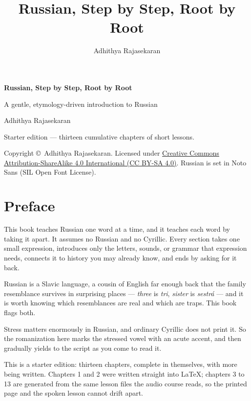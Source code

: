 \documentclass[11pt,twoside]{book}
\title{\Huge Russian, Step by Step, Root by Root}
\author{Adhithya Rajasekaran}
\date{}
\begin{document}
\frontmatter

\begin{titlepage}
  \centering
  \vspace*{3cm}
  {\Huge\bfseries Russian, Step by Step, Root by Root\par}
  \vspace{1cm}
  {\Large A gentle, etymology-driven introduction to Russian\par}
  \vspace{1.5cm}
  {\large Adhithya Rajasekaran\par}
  \vfill
  {\large Starter edition --- thirteen cumulative chapters of short lessons.\par}
  \vspace{2cm}
  {\normalsize
    Copyright \copyright\ Adhithya Rajasekaran. Licensed under
    \href{https://creativecommons.org/licenses/by-sa/4.0/}%
    {Creative Commons Attribution-ShareAlike 4.0 International (CC BY-SA 4.0)}.
    Russian is set in Noto Sans (SIL Open Font License).\par
  }
\end{titlepage}

\chapter*{Preface}

This book teaches Russian one word at a time, and it teaches each word by taking
it apart. It assumes no Russian and no Cyrillic. Every section takes one small
expression, introduces only the letters, sounds, or grammar that expression
needs, connects it to history you may already know, and ends by asking for it
back.

Russian is a Slavic language, a cousin of English far enough back that the
family resemblance survives in surprising places --- \emph{three} is
\emph{tri}, \emph{sister} is \emph{sestr\'{a}} --- and it is worth knowing which
resemblances are real and which are traps. This book flags both.

Stress matters enormously in Russian, and ordinary Cyrillic does not print it.
So the romanization here marks the stressed vowel with an acute accent, and
then gradually yields to the script as you come to read it.

This is a starter edition: thirteen chapters, complete in themselves, with
more being written. Chapters 1 and 2 were written straight into \LaTeX;
chapters 3 to 13 are generated from the same lesson files the audio course
reads, so the printed page and the spoken lesson cannot drift apart.
\end{document}
